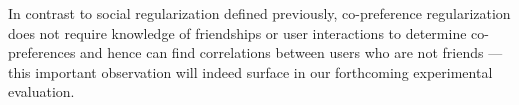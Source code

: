 In contrast to social regularization
defined previously, co-preference regularization does not require knowledge
of friendships or user interactions to determine co-preferences and hence
can find correlations between users who are not friends --- this important
observation will indeed surface in our forthcoming experimental evaluation.

\begin{comment}
\subsubsection{Social Co-preference Spectral Regularization ($\Obj_\rscs$)}
This is the same as the social co-preference regularization above, except that it uses the spectral regularizer format for 
learning the co-preferences.

 We use $\| \cdot \|_{2,\bullet}$ to denote a re-weighted $L_2$ norm. The reweighing of this norm servers the same purpose as the re-weighted inner product in Section~\ref{sec:rsc}, it tailors the similarities or dissimilarities between users to specific sets of items. This allows users $\x$
and $\z$ to be similar or opposite in the same latent latent space
relevant only to item $\y$.  
 
 The objective component for
 social co-preference spectral regularization along with its expanded form is
 
\begin{align}
\Obj_\rscs & = \sum_{(\x,\z,\y) \in C} \frac{1}{2} P_{\x,\z,\y} \| U\x - U\z \|_{2,V\y}^2 \\
& = \sum_{(\x,\z,\y) \in C} \frac{1}{2} P_{\x,\z,\y} (\x - \z)^T U^T \diag(V\y) U (\x - \z) \nonumber 
\end{align}
\end{comment}

